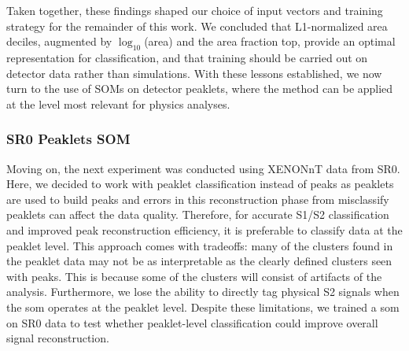 Taken together, these findings shaped our choice of input vectors and training strategy for the remainder of this work. We concluded that L1-normalized area deciles, augmented by $\log_{10}$(area) and the area fraction top, provide an optimal representation for classification, and that training should be carried out on detector data rather than simulations. With these lessons established, we now turn to the use of SOMs on detector peaklets, where the method can be applied at the level most relevant for physics analyses.

\subsubsection{SR0 Peaklets SOM}

Moving on, the next experiment was conducted using XENONnT data from SR0. Here, we decided to work with peaklet classification instead of peaks as peaklets are used to build peaks and errors in this reconstruction phase from misclassify peaklets can affect the data quality. Therefore, for accurate S1/S2 classification and improved peak reconstruction efficiency, it is preferable to classify data at the peaklet level. This approach comes with tradeoffs: many of the clusters found in the peaklet data may not be as interpretable as the clearly defined clusters seen with peaks. This is because some of the clusters will consist of artifacts of the analysis. Furthermore, we lose the ability to directly tag physical S2 signals when the \acrshort{som} operates at the peaklet level. Despite these limitations, we trained a \acrshort{som} on SR0 data to test whether peaklet-level classification could improve overall signal reconstruction.


